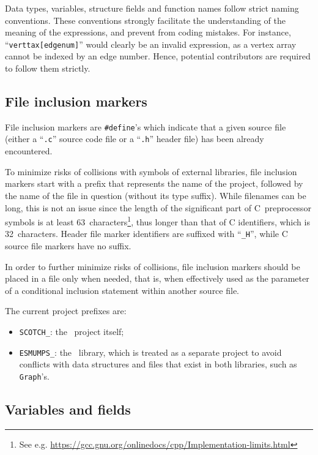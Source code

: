Data types, variables, structure fields and function names follow
strict naming conventions. These conventions strongly facilitate the
understanding of the meaning of the expressions, and prevent from
coding mistakes. For instance, ``\texttt{verttax[edgenum]}'' would
clearly be an invalid expression, as a vertex array cannot be indexed
by an edge number. Hence, potential contributors are required to
follow them strictly.

\subsection{File inclusion markers}
\label{sec-naming-file-inclusion-markers}

File inclusion markers are \texttt{\#define}'s which indicate that a
given source file (either a ``\texttt{.c}'' source code file or a
``\texttt{.h}'' header file) has been already encountered.

To minimize risks of collisions with symbols of external libraries,
file inclusion markers start with a prefix that represents the name of
the project, followed by the name of the file in question (without its
type suffix). While filenames can be long, this is not an issue since
the length of the significant part of C~preprocessor symbols is at
least 63~characters\footnote{See e.g.
\url{https://gcc.gnu.org/onlinedocs/cpp/Implementation-limits.html}},
thus longer than that of C identifiers, which is 32~characters.
Header file marker identifiers are suffixed with ``\texttt{\_H}'',
while C source file markers have no suffix.

In order to further minimize risks of collisions, file inclusion
markers should be placed in a file only when needed, that is, when
effectively used as the parameter of a conditional inclusion statement
within another source file.

The current project prefixes are:
\begin{itemize}
\item
  \texttt{SCOTCH\_}: the \scotch\ project itself;
\item
  \texttt{ESMUMPS\_}: the \esmumps\ library, which is treated as a
  separate project to avoid conflicts with data structures and files
  that exist in both libraries, such as \texttt{Graph}'s.
\end{itemize}

\subsection{Variables and fields}
\label{sec-naming-variables}

